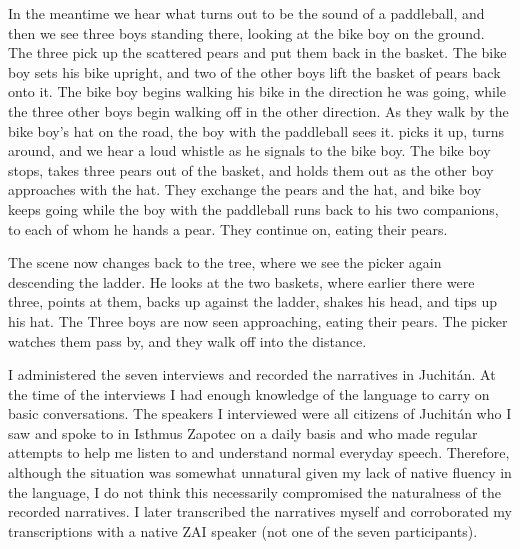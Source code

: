 {In the meantime we hear what turns out to be the sound of a paddleball, and then we see three boys standing there, looking at the bike boy on the ground. The three pick up the scattered pears and put them back in the basket. The bike boy sets his bike upright, and two of the other boys lift the basket of pears back onto it. The bike boy begins walking his bike in the direction he was going, while the three other boys begin walking off in the other direction. As they walk by the bike boy's hat on the road, the boy with the paddleball sees it. picks it up, turns around, and we hear a loud whistle as he signals to the bike boy. The bike boy stops, takes three pears out of the basket, and holds them out as the other boy approaches with the hat. They exchange the pears and the hat, and bike boy keeps going while the boy with the paddleball runs back to his two companions, to each of whom he hands a pear. They continue on, eating their pears. 

The scene now changes back to the tree, where we see the picker again descending the ladder. He looks at the two baskets, where earlier there were three, points at them, backs up against the ladder, shakes his head, and tips up his hat. The Three boys are now seen approaching, eating their pears. The picker watches them pass by, and they walk off into the distance.} 

I administered the seven interviews and recorded the narratives in Juchit\'{a}n. At the time of the interviews I had enough knowledge of the language to carry on basic conversations. The speakers I interviewed were all citizens of Juchit\'{a}n who I saw and spoke to in Isthmus Zapotec on a daily basis and who made regular attempts to help me listen to and understand normal everyday speech. Therefore, although the situation was somewhat unnatural given my lack of native fluency in the language, I do not think this necessarily compromised the naturalness of the recorded narratives. I later transcribed the narratives myself and corroborated my transcriptions with a native ZAI speaker (not one of the seven participants). 
 
